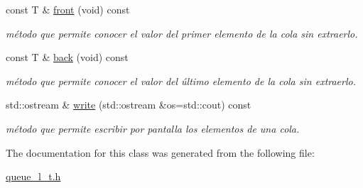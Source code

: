 \begin{DoxyCompactItemize}
\mbox{\label{classqueue__l__t_ae534d68e4eeca2e7df5897173315258f}} 
const T \& \hyperlink{classqueue__l__t_ae534d68e4eeca2e7df5897173315258f}{front} (void) const
\begin{DoxyCompactList}\small\item\em método que permite conocer el valor del primer elemento de la cola sin extraerlo. \end{DoxyCompactList}\item 
\mbox{\label{classqueue__l__t_afc1e16fea48d8191851e2c93e61eee4a}} 
const T \& \hyperlink{classqueue__l__t_afc1e16fea48d8191851e2c93e61eee4a}{back} (void) const
\begin{DoxyCompactList}\small\item\em método que permite conocer el valor del último elemento de la cola sin extraerlo. \end{DoxyCompactList}\item 
\mbox{\label{classqueue__l__t_a7af380db368177f66f9d7c5618e43e01}} 
std\+::ostream \& \hyperlink{classqueue__l__t_a7af380db368177f66f9d7c5618e43e01}{write} (std\+::ostream \&os=std\+::cout) const
\begin{DoxyCompactList}\small\item\em método que permite escribir por pantalla los elementos de una cola. \end{DoxyCompactList}\end{DoxyCompactItemize}


The documentation for this class was generated from the following file\+:\begin{DoxyCompactItemize}
\item 
\hyperlink{queue__l__t_8h}{queue\+\_\+l\+\_\+t.\+h}\end{DoxyCompactItemize}
